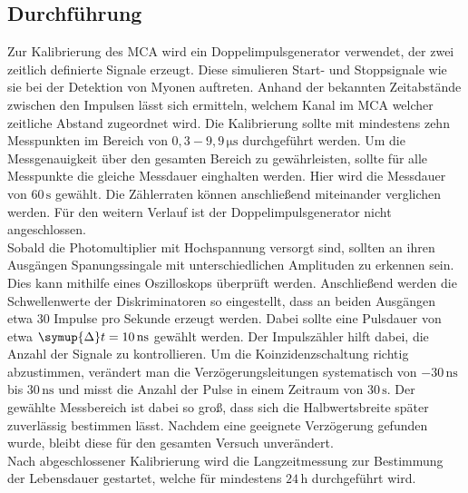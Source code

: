 \subsection{Durchführung}
\label{sec:Durchführung}
Zur Kalibrierung des MCA wird ein Doppelimpulsgenerator verwendet, der zwei zeitlich definierte Signale erzeugt. Diese simulieren Start- und Stoppsignale wie sie bei der Detektion von Myonen auftreten. 
Anhand der bekannten Zeitabstände zwischen den Impulsen lässt sich ermitteln, welchem Kanal im MCA welcher zeitliche Abstand zugeordnet wird.
Die Kalibrierung sollte mit mindestens zehn Messpunkten im Bereich von $0,3 - 9,9 \,\unit{\micro\second}$ durchgeführt werden. 
Um die Messgenauigkeit über den gesamten Bereich zu gewährleisten, sollte für alle Messpunkte die gleiche Messdauer einghalten werden. Hier wird die Messdauer von $60\,\unit{\second}$ gewählt.
Die Zählerraten können anschließend miteinander verglichen werden. Für den weitern Verlauf ist der Doppelimpulsgenerator nicht angeschlossen.\\
Sobald die Photomultiplier mit Hochspannung versorgt sind, sollten an ihren Ausgängen Spanungssingale mit unterschiedlichen Amplituden zu erkennen sein.
Dies kann mithilfe eines Oszilloskops überprüft werden.
Anschließend werden die Schwellenwerte der Diskriminatoren so eingestellt, dass an beiden Ausgängen etwa 30 Impulse pro Sekunde erzeugt werden. Dabei sollte eine
Pulsdauer von etwa $\symup{\Delta} t = 10\,\unit{\nano\second}$ gewählt werden. Der Impulszähler hilft dabei, die Anzahl der Signale zu kontrollieren. Um die Koinzidenzschaltung richtig abzustimmen,
verändert man die Verzögerungsleitungen systematisch von $-30 \, \unit{\nano\second}$ bis $30 \, \unit{\nano\second}$ und misst die Anzahl der Pulse in einem Zeitraum von $30 \, \unit{\second}$. Der gewählte Messbereich
ist dabei so groß, dass sich die Halbwertsbreite später zuverlässig bestimmen lässt. Nachdem eine geeignete Verzögerung gefunden wurde, bleibt diese für den gesamten Versuch unverändert.\\
Nach abgeschlossener Kalibrierung wird die Langzeitmessung zur Bestimmung der Lebensdauer gestartet, welche für mindestens $24\,\unit{\hour}$ durchgeführt wird.
